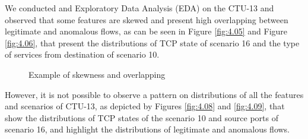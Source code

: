 We conducted and Exploratory Data Analysis (EDA) on the CTU-13 and observed that some features are skewed and present high overlapping between legitimate and anomalous flows, as can be seen in Figure \ref{fig:4.05} and Figure \ref{fig:4.06}, that present the distributions of TCP state of scenario 16 and the type of services from destination of scenario 10.

\begin{figure}[!htb]
	\centering
	\caption[Skewness and Overlapping]{Example of skewness and overlapping}
	\label{fig:4.07}
\end{figure}

However, it is not possible to observe a pattern on distributions of all the features and scenarios of CTU-13, as depicted by Figures \ref{fig:4.08} and \ref{fig:4.09}, that show the distributions of TCP states of the scenario 10 and source ports of scenario 16, and highlight the distributions of legitimate and anomalous flows.

